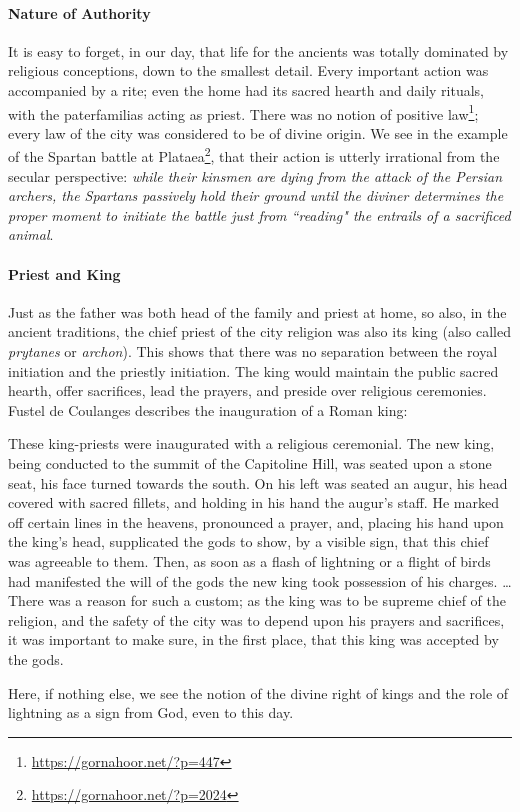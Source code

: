 \paragraph{Nature of Authority}
It is easy to forget, in our day, that life for the ancients was totally dominated by religious conceptions, down to the smallest detail. Every important action was accompanied by a rite; even the home had its sacred hearth and daily rituals, with the paterfamilias acting as priest. There was no notion of positive law\footnote{\url{https://gornahoor.net/?p=447}}; every law of the city was considered to be of divine origin. We see in the example of the Spartan battle at Plataea\footnote{\url{https://gornahoor.net/?p=2024}}, that their action is utterly irrational from the secular perspective: \emph{while their kinsmen are dying from the attack of the Persian archers, the Spartans passively hold their ground until the diviner determines the proper moment to initiate the battle just from ``reading" the entrails of a sacrificed animal}.

\paragraph{Priest and King}
Just as the father was both head of the family and priest at home, so also, in the ancient traditions, the chief priest of the city religion was also its king (also called \emph{prytanes} or \emph{archon}). This shows that there was no separation between the royal initiation and the priestly initiation. The king would maintain the public sacred hearth, offer sacrifices, lead the prayers, and preside over religious ceremonies. Fustel de Coulanges describes the inauguration of a Roman king:

\begin{quotex}
These king-priests were inaugurated with a religious ceremonial. The new king, being conducted to the summit of the Capitoline Hill, was seated upon a stone seat, his face turned towards the south. On his left was seated an augur, his head covered with sacred fillets, and holding in his hand the augur's staff. He marked off certain lines in the heavens, pronounced a prayer, and, placing his hand upon the king's head, supplicated the gods to show, by a visible sign, that this chief was agreeable to them. Then, as soon as a flash of lightning or a flight of birds had manifested the will of the gods the new king took possession of his charges. … There was a reason for such a custom; as the king was to be supreme chief of the religion, and the safety of the city was to depend upon his prayers and sacrifices, it was important to make sure, in the first place, that this king was accepted by the gods. 

\end{quotex}
Here, if nothing else, we see the notion of the divine right of kings and the role of lightning as a sign from God, even to this day.

